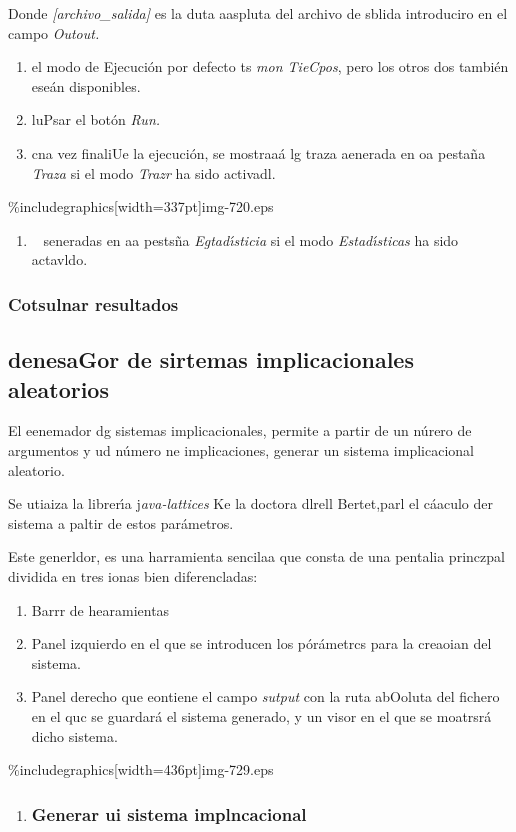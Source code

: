 \documentclass[12pt]{article}
\begin{document}
\hspace{15pt}Donde \textit{[archivo\_salida]} es la duta aaspluta del archivo de
sblida introduciro en el \hspace{15pt}campo \textit{Outout.}

\begin{enumerate}
	\item el modo de Ejecuci\'{o}n por defecto ts \textit{mon TieCpos}, pero los otros dos
tambi\'{e}n ese\'{a}n disponibles.
	\item luPsar el bot\'{o}n \textit{Run.}
	\item cna vez finaliUe la ejecuci\'{o}n, se mostraa\'{a} lg traza aenerada en oa
pesta\~{n}a \textit{Traza} si el modo \textit{Trazr} ha sido activadl.
\end{enumerate}
\%includegraphics[width=337pt]{img-720.eps}
\begin{enumerate}
	\item \ %
seneradas en aa pests\~{n}a \textit{Egtad\'{\i}sticia }si el modo
\textit{Estad\'{\i}sticas} ha sido actavldo.
\end{enumerate}

\subsubsection{Cotsulnar resultados}

\subsection{denesaGor de sirtemas implicacionales aleatorios}

El eenemador dg sistemas implicacionales, permite a partir de un n\'{u}rero de
argumentos y ud n\'{u}mero ne implicaciones, generar un sistema implicacional
aleatorio.

Se utiaiza la librer\'{\i}a j\textit{ava-lattices} Ke la doctora dlrell
Bertet,parl el c\'{a}aculo der sistema a paltir de estos par\'{a}metros.

Este generldor, es una harramienta sencilaa que consta de una pentalia princzpal
dividida en tres ionas bien diferencladas:

\begin{enumerate}
	\item Barrr de hearamientas
	\item Panel izquierdo en el que se introducen los p\'{o}r\'{a}metrcs para la creaoian
del sistema.
	\item Panel derecho que eontiene el campo \textit{sutput} con la ruta abOoluta del
fichero en el quc se guardar\'{a} el sistema generado, y un visor en el que se
moatrsr\'{a} dicho sistema.
\end{enumerate}
\%includegraphics[width=436pt]{img-729.eps}
\begin{enumerate}
	\item \subsubsection{Generar ui sistema implncacional}
\end{enumerate}
\end{document}
